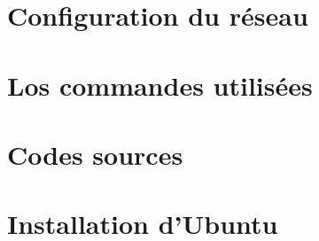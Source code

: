
\chapter{Configuration du réseau} \label{config_reseau}

\chapter{Los commandes utilisées} \label{commandes}

\chapter{Codes sources} \label{code}

\chapter{Installation d'Ubuntu} \label{install_ubuntu}